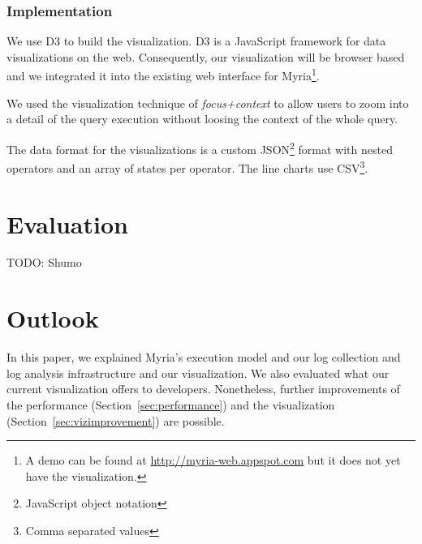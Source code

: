 \documentclass[11pt]{scrartcl}
\begin{document}

\subsubsection{Implementation}

We use D3\cite{bostock2011d3} to build the visualization. D3 is a JavaScript framework for data visualizations on the web. Consequently, our visualization will be browser based and we integrated it into the existing web interface for Myria\footnote{A demo can be found at \url{http://myria-web.appspot.com} but it does not yet have the visualization.}.

We used the visualization technique of \emph{focus+context}\cite{furnas1986generalized} to allow users to zoom into a detail of the query execution without loosing the context of the whole query.

The data format for the visualizations is a custom JSON\footnote{JavaScript object notation} format with nested operators and an array of states per operator. The line charts use CSV\footnote{Comma separated values}.


\section{Evaluation}
\label{sec:evaluation}

TODO: Shumo



\section{Outlook}
\label{sec:outlook}

In this paper, we explained Myria's execution model and our log collection and log analysis infrastructure and our visualization. We also evaluated what our current visualization offers to developers. Nonetheless, further improvements of the performance (Section~\ref{sec:performance}) and the visualization (Section~\ref{sec:vizimprovement}) are possible.
\end{document}
